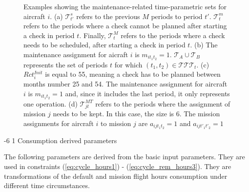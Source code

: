 \documentclass[a4paper,onecolumn,fleqn]{article}
\makeatletter
\renewcommand\subsubsection{\@startsection{subsubsection}{3}{\z@}%
                       {-6\p@ \@plus -0\p@ \@minus -0\p@}%
                       {1\p@ \@plus 0\p@ \@minus 0\p@}%
                       {\normalsize\itshape\bfseries}}
\makeatother
\begin{document}
    \begin{figure}
        \centering
        \begin{tikzpicture}
            
        \end{tikzpicture}
        \begin{tikzpicture}
            
        \end{tikzpicture}
        \begin{tikzpicture}
            
        \end{tikzpicture}
        \begin{tikzpicture}
            
        \end{tikzpicture}
        \caption{Examples showing the maintenance-related time-parametric sets for aircraft $i$. (a) $\mathcal{T}_{t'}^{s}$ refers to the previous $M$ periods to period $t'$. $\mathcal{T}_{t}^{m}$ refers to the periods where a check cannot be planned after starting a check in period $t$. Finally, $\mathcal{T}_{t}^{M}$ refers to the periods where a check needs to be scheduled, after starting a check in period $t$. (b) The maintenance assignment for aicraft $i$ is $m_{it_1t_2}=1$. $\mathcal{T}_A \cup \mathcal{T}_B$ represents the set of periods $t$ for which $(t_1, t_2) \in \mathcal{TTT}_t$. (c) $Rct_{i}^{Init}$ is equal to 55, meaning a check has to be planned between months number 25 and 54. The maintenance assignment for aircraft $i$ is $m_{it_1t_2}=1$ and, since it includes the last period, it only represents one operation. (d) $\mathcal{T}_{jt}^{MT}$ refers to the periods where the assignment of mission $j$ needs to be kept. In this case, the size is 6. The mission assignments for aircraft $i$ to mission $j$ are $a_{ijt_1t_2}=1$ and $a_{ijt'_1t'_2}=1$}
        \label{fig:gantt_windows}
    \end{figure}

    \subsubsection{Consumption derived parameters}\label{subsubsec:consumption}

    The following parameters are derived from the basic input parameters. They are used in constraints (\ref{eq:cycle_hours1}) - (\ref{eq:cycle_rem_hours3}). They are transformations of the default and mission flight hours consumption under different time circumstances.
\end{document}
